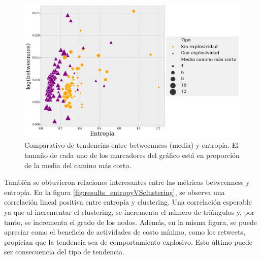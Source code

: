 \documentclass[../main.tex]{subfiles}
\begin{document}
\begin{figure}[h!]
    \centering
    \includegraphics[scale = 0.40]{images/results_entropyVSbetweennes.png}
    \caption{Comparativo de tendencias entre   betweenness (media) y entropía. El tamaño de cada uno de los marcadores del gráfico está en proporción de la media del camino más corto. }
    \label{fig:results_entropyVSbetweeness}
\end{figure}


También se obtuvieron relaciones interesantes entre las métricas betweenness y entropía. En la figura \ref{fig:results_entropyVSclustering},  se observa una  correlación lineal positiva entre entropía y clustering. Una correlación esperable ya que al incrementar el clustering, se incrementa el número de triángulos y, por tanto, se incrementa el grado de los nodos.  Además, en la misma figura, se puede apreciar como el beneficio de actividades de costo mínimo, como los retweets, propician que la tendencia sea de comportamiento explosivo. Esto último puede ser consecuencia del tipo de tendencia. 


\end{document}
